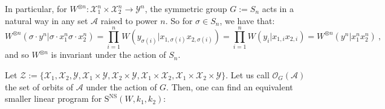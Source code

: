 \documentclass[11pt]{article}
\theoremstyle{definition}
\theoremstyle{remark}
\begin{document}
In particular, for  $W^{\otimes n}: \mathcal{X}_1^n \times \mathcal{X}_2^n \rightarrow \mathcal{Y}^n$, the symmetric group $G:=S_n$ acts in a natural way in any set $\mathcal{A}$ raised to power $n$. So for $\sigma \in S_n$, we have that:
\[ W^{\otimes n}(\sigma \cdot y^n|\sigma \cdot x_1^n \sigma \cdot x_2^n) =\prod_{i=1}^n W(y_{\sigma(i)}|x_{1,\sigma(i)}x_{2,\sigma(i)}) = \prod_{i=1}^n W(y_{i}|x_{1,i}x_{2,i}) = W^{\otimes n}(y^n|x_1^nx_2^n) \ ,\]
and so $W^{\otimes n}$ is invariant under the action of $S_n$.

Let $\mathcal{Z} := \{\mathcal{X}_1, \mathcal{X}_2, \mathcal{Y}, \mathcal{X}_1 \times \mathcal{Y}, \mathcal{X}_2 \times \mathcal{Y}, \mathcal{X}_1 \times \mathcal{X}_2,  \mathcal{X}_1 \times \mathcal{X}_2 \times \mathcal{Y} \}$. Let us call $\mathcal{O}_G(\mathcal{A})$ the set of orbits of $\mathcal{A}$ under the action of $G$. Then, one can find an equivalent smaller linear program for $\mathrm{S}^{\mathrm{NS}}(W,k_1,k_2)$:
\end{document}
